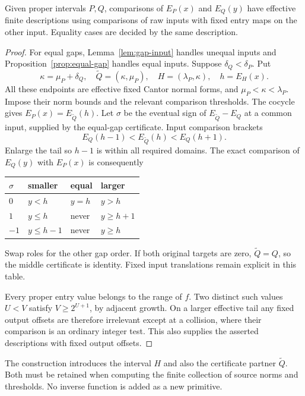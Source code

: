 \begin{proposition}\label{prop:threshold}
Given proper intervals \(P,Q\), comparisons of \(E_P(x)\) and
\(E_Q(y)\) have effective finite descriptions using comparisons of raw
inputs with fixed entry maps on the other input. Equality cases are
decided by the same description.
\end{proposition}
\begin{proof}
For equal gaps, Lemma~\ref{lem:gap-input} handles unequal inputs and
Proposition~\ref{prop:equal-gap} handles equal inputs. Suppose
\(\delta_Q<\delta_P\). Put
\[
 \kappa=\mu_P+\delta_Q,\quad
 \widetilde Q=(\kappa,\mu_P),\quad
 H=(\lambda_P,\kappa),\quad h=E_H(x).
\]
All these endpoints are effective fixed Cantor normal forms, and
\(\mu_P<\kappa<\lambda_P\). Impose their norm bounds and the relevant
comparison thresholds. The cocycle gives
\(E_P(x)=E_{\widetilde Q}(h)\).
Let \(\sigma\) be the eventual sign of
\(E_{\widetilde Q}-E_Q\) at a common input, supplied by the equal-gap
certificate. Input comparison brackets
\[
 E_Q(h-1)<E_{\widetilde Q}(h)<E_Q(h+1).
\]
Enlarge the tail so \(h-1\) is within all required domains. The exact
comparison of \(E_Q(y)\) with \(E_P(x)\) is consequently
\begin{center}\small
\begin{tabular}{@{}llll@{}}\toprule
\(\sigma\)& smaller & equal & larger\\\midrule
\(0\)&\(y<h\)&\(y=h\)&\(y>h\)\\
\(1\)&\(y\le h\)&never&\(y\ge h+1\)\\
\(-1\)&\(y\le h-1\)&never&\(y\ge h\)\\\bottomrule
\end{tabular}
\end{center}
Swap roles for the other gap order. If both original targets are zero,
\(\widetilde Q=Q\), so the middle certificate is identity.
Fixed input translations remain explicit in this table.

Every proper entry value belongs to the range of \(f\). Two distinct
such values \(U<V\) satisfy \(V\ge2^{U+1}\), by adjacent growth.
On a larger effective tail any fixed output offsets are therefore
irrelevant except at a collision, where their comparison is an ordinary
integer test. This also supplies the asserted descriptions with fixed
output offsets.
\end{proof}

The construction introduces the interval \(H\) and also the certificate
partner \(\widetilde Q\). Both must be retained when computing the
finite collection of source norms and thresholds. No inverse function
is added as a new primitive.
